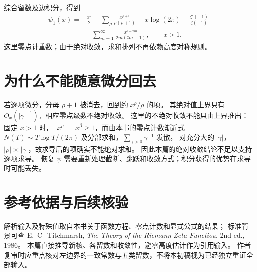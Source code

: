 \documentclass[UTF8,fontset=fandol,11pt]{ctexart}
\begin{document}
综合留数及边积分，得到
\[
\begin{aligned}
 \psi_1(x)
 ={}&\frac{x^2}{2}
 -\sum_\rho\frac{x^{\rho+1}}{\rho(\rho+1)}
 -x\log(2\pi)+\frac{\zeta'(-1)}{\zeta(-1)}\\
 &-\sum_{m=1}^\infty\frac{x^{1-2m}}{2m(2m-1)},\qquad x>1.
\end{aligned}
\]
这里零点计重数；由于绝对收敛，求和排列不再依赖高度对称规则。

\section{为什么不能随意微分回去}
若逐项微分，分母 $\rho+1$ 被消去，回到约 $x^\rho/\rho$ 的项。
其绝对值上界只有 $O_x(|\gamma|^{-1})$，相应零点级数不绝对收敛。
这里的不绝对收敛不能只由上界推出：固定 $x>1$ 时，
$|x^\rho|=x^\beta\ge1$，而由本书的零点计数渐近式
$N(T)\sim T\log T/(2\pi)$ 及分部求和，$\sum_{\gamma>0}\gamma^{-1}$ 发散。
对充分大的 $|\gamma|$，$|\rho|\asymp|\gamma|$，故求导后的项确实不能绝对求和。
因此本篇的绝对收敛结论不足以支持逐项求导。
恢复 $\psi$ 需要重新处理截断、跳跃和收敛方式；积分获得的优势在求导时可能丢失。

\section*{参考依据与后续核验}
解析输入及特殊值取自本书关于函数方程、零点计数和显式公式的结果；
标准背景可查 E.\ C.\ Titchmarsh, \emph{The Theory of the Riemann Zeta-Function}, 2nd ed., 1986。
本篇直接推导新核、各留数和收敛性，避零高度估计作为引用输入。
作者复审时应重点核对左边界的一致常数与五类留数，不将本初稿视为已经独立重证全部输入。
\end{document}
